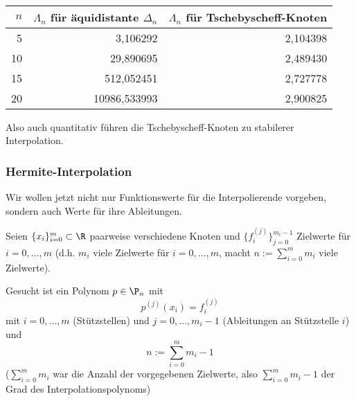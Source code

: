\documentclass[11pt]{scrartcl}
\begin{document}
\begin{ex*}~

	\begin{table}[!ht]
		\centering
		\begin{tabular}{r|r|r}
			$n$ & $\Lambda_n$ für äquidistante $\Delta_n$ & $\Lambda_n$ für Tschebyscheff-Knoten \\ \hline
			5 & 3,106292 & 2,104398 \\
			10 & 29,890695 & 2,489430 \\
			15 & 512,052451 & 2,727778 \\
			20 & 10986,533993 & 2,900825
		\end{tabular}
	\end{table}		
	Also auch quantitativ führen die Tschebyscheff-Knoten zu stabilerer Interpolation.
\end{ex*}


\subsubsection{Hermite-Interpolation}

Wir wollen jetzt nicht nur Funktionswerte für die Interpolierende vorgeben, sondern auch Werte für ihre Ableitungen.

Seien $\{x_i\}_{i=0}^m \subset \R$ paarweise verschiedene Knoten und $\{f_i^{(j)}\}_{j=0}^{m_i-1}$ Zielwerte für $i=0,\dotsc, m$ (d.h. $m_i$ viele Zielwerte für $i=0,\dotsc, m$, macht $n := \sum_{i=0}^m m_i$ viele Zielwerte).

Gesucht ist ein Polynom $p\in \P_n$ mit 
\[
	p^{(j)}(x_i) =f_i^{(j)}
\]
mit $i=0,\dotsc,m$ (Stützstellen) und $j=0,\dotsc,m_i-1$ (Ableitungen an Stützstelle $i$) und 
\[
	n := \sum_{i=0}^m m_i - 1
\]
($\sum_{i=0}^m m_i$ war die Anzahl der vorgegebenen Zielwerte, also $\sum_{i=0}^m m_i -1$ der Grad des Interpolationspolynoms)
\end{document}
